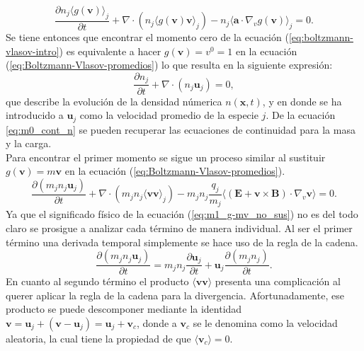 \documentclass[../tesis_main_file.tex]{subfiles}
\begin{document}
    \begin{equation}
    \label{eq:Boltzmann-Vlasov-promedios}
    \frac{\partial n_j \langle g(\textbf{v}) \rangle_j}{\partial t}+\nabla \cdot (n_j \langle g(\textbf{v}) \textbf{v} \rangle_j)-n_j \langle \textbf{a}\cdot \nabla_v g(\textbf{v}) \rangle_j=0.
    \end{equation}
Se tiene entonces que encontrar el momento cero de la ecuación (\ref{eq:boltzmann-vlasov-intro}) es equivalente a hacer $g(\textbf{v})=v^0=1$ en la ecuación (\ref{eq:Boltzmann-Vlasov-promedios}) lo que resulta en la siguiente expresión:
\begin{equation}
\label{eq:m0_cont_n}
\frac{\partial n_j}{\partial t}+\nabla \cdot (n_j \textbf{u}_j)=0,
\end{equation}
que describe la evolución de la densidad númerica $n(\textbf{x},t)$, y en donde se ha introducido a $\textbf{u}_j$ como la velocidad promedio de la especie $j$. De la ecuación \ref{eq:m0_cont_n} se pueden recuperar las ecuaciones de continuidad para la masa y la carga.\\
Para encontrar el primer momento se sigue un proceso similar al sustituir $g(\textbf{v})=m\textbf{v}$ en la ecuación (\ref{eq:Boltzmann-Vlasov-promedios}).
\begin{equation}
\label{eq:m1_g-mv_no_sus}
\frac{\partial (m_jn_j\textbf{u}_j)}{\partial t}+\nabla \cdot (m_jn_j\langle \textbf{v}\textbf{v} \rangle_j)-m_jn_j\frac{q_j}{m_j}\langle (\textbf{E}+\textbf{v}\times \textbf{B})\cdot \nabla_v\textbf{v}\rangle=0.
\end{equation}
Ya que el significado físico de la ecuación (\ref{eq:m1_g-mv_no_sus}) no es del todo claro se prosigue a analizar cada término de manera individual.
Al ser el primer término una derivada temporal simplemente se hace uso de la regla de la cadena.
\begin{equation}
\label{eq:m1_primer_termino}
\frac{\partial (m_jn_j\textbf{u}_j)}{\partial t}= m_jn_j\frac{\partial \textbf{u}_j}{\partial t}+ \textbf{u}_j\frac{\partial (m_jn_j)}{\partial t}.
\end{equation}
En cuanto al segundo término el producto $\langle \textbf{v} \textbf{v} \rangle $ presenta una complicación al querer aplicar la regla de la cadena para la divergencia. Afortunadamente, ese producto se puede descomponer mediante la identidad
$\textbf{v}=\textbf{u}_j+(\textbf{v}-\textbf{u}_j)=\textbf{u}_j+\textbf{v}_c$, donde a $\textbf{v}_c$ se le denomina como la velocidad aleatoria, la cual tiene la propiedad de que $\langle \textbf{v}_c \rangle=0$.
\end{document}
